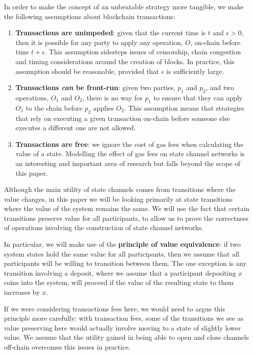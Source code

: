 \documentclass{article}
\begin{document}
In order to make the concept of an unbeatable strategy more tangible, we make the following assumptions about blockchain transactions:
\begin{enumerate}
  \item \textbf{Transactions are unimpeded}: given that the current time is $t$ and $\epsilon > 0$, then it is possible for any party to apply any operation, $O$, on-chain before time $t + \epsilon$.
  This assumption sidesteps issues of censorship, chain congestion and timing considerations around the creation of blocks.
  In practice, this assumption should be reasonable, provided that $\epsilon$ is sufficiently large.
  \item \textbf{Transactions \textit{can} be front-run}: given two parties, $p_1$ and $p_2$, and two operations, $O_1$ and $O_2$, there is no way for $p_1$ to ensure that they can apply $O_1$ to the chain before $p_2$ applies $O_2$.
  This assumption means that strategies that rely on executing a given transaction on-chain before someone else executes a different one are not allowed.
  \item \textbf{Transactions are free}: we ignore the cost of gas fees when calculating the value of a state.
  Modelling the effect of gas fees on state channel networks is an interesting and important area of research but falls beyond the scope of this paper.
\end{enumerate}

Although the main utility of state channels comes from transitions where the value changes,
in this paper we will be looking primarily at state transitions where the value of the system
remains the same.
We will use the fact that certain transitions preserve value for all participants, to allow us
to prove the correctness of operations involving the construction of state channel networks.

In particular, we will make use of the \textbf{principle of value equivalence}: if two system
states hold the same value for all participants, then we assume that all participants will
be willing to transition between them.
The one exception is any transition involving a deposit, where we assume that a participant depositing
$x$ coins into the system, will proceed if the value of the resulting state to them increases by $x$.

If we were considering transactions fees here, we would need to argue this principle more
carefully: with transaction fees, some of the transitions we see as value preserving here
would actually involve moving to a state of slightly lower value. 
We assume that the utility gained in being able to open and close channels off-chain overcomes
this issues in practice.
\end{document}
